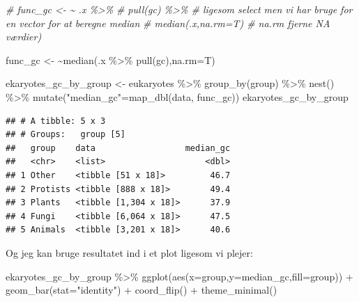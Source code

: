 \documentclass[
]{book}
\newenvironment{Shaded}{\begin{snugshade}}{\end{snugshade}}
\newcommand{\AttributeTok}[1]{\textcolor[rgb]{0.77,0.63,0.00}{#1}}
\newcommand{\CommentTok}[1]{\textcolor[rgb]{0.56,0.35,0.01}{\textit{#1}}}
\newcommand{\ErrorTok}[1]{\textcolor[rgb]{0.64,0.00,0.00}{\textbf{#1}}}
\newcommand{\FunctionTok}[1]{\textcolor[rgb]{0.00,0.00,0.00}{#1}}
\newcommand{\NormalTok}[1]{#1}
\newcommand{\OtherTok}[1]{\textcolor[rgb]{0.56,0.35,0.01}{#1}}
\newcommand{\SpecialCharTok}[1]{\textcolor[rgb]{0.00,0.00,0.00}{#1}}
\newcommand{\StringTok}[1]{\textcolor[rgb]{0.31,0.60,0.02}{#1}}
\begin{document}
\begin{Shaded}
\begin{Highlighting}[]
\CommentTok{\# func\_gc \textless{}{-} \textasciitilde{} .x \%\textgreater{}\% }
\CommentTok{\#   pull(gc) \%\textgreater{}\%       \# ligesom select men vi har bruge for en vector for at beregne median}
\CommentTok{\#   median(.x,na.rm=T) \# \textasciigrave{}na.rm\textasciigrave{} fjerne \textasciigrave{}NA\textasciigrave{} værdier)}

\NormalTok{func\_gc }\OtherTok{\textless{}{-}} \ErrorTok{\textasciitilde{}}\FunctionTok{median}\NormalTok{(.x }\SpecialCharTok{\%\textgreater{}\%} \FunctionTok{pull}\NormalTok{(gc),}\AttributeTok{na.rm=}\NormalTok{T) }

\NormalTok{ekaryotes\_gc\_by\_group }\OtherTok{\textless{}{-}}\NormalTok{ eukaryotes }\SpecialCharTok{\%\textgreater{}\%} 
  \FunctionTok{group\_by}\NormalTok{(group) }\SpecialCharTok{\%\textgreater{}\%} 
  \FunctionTok{nest}\NormalTok{() }\SpecialCharTok{\%\textgreater{}\%} 
  \FunctionTok{mutate}\NormalTok{(}\StringTok{"median\_gc"}\OtherTok{=}\FunctionTok{map\_dbl}\NormalTok{(data, func\_gc))}
\NormalTok{ekaryotes\_gc\_by\_group}
\end{Highlighting}
\end{Shaded}

\begin{verbatim}
## # A tibble: 5 x 3
## # Groups:   group [5]
##   group    data                  median_gc
##   <chr>    <list>                    <dbl>
## 1 Other    <tibble [51 x 18]>         46.7
## 2 Protists <tibble [888 x 18]>        49.4
## 3 Plants   <tibble [1,304 x 18]>      37.9
## 4 Fungi    <tibble [6,064 x 18]>      47.5
## 5 Animals  <tibble [3,201 x 18]>      40.6
\end{verbatim}

Og jeg kan bruge resultatet ind i et plot ligesom vi plejer:

\begin{Shaded}
\begin{Highlighting}[]
\NormalTok{ekaryotes\_gc\_by\_group }\SpecialCharTok{\%\textgreater{}\%} 
  \FunctionTok{ggplot}\NormalTok{(}\FunctionTok{aes}\NormalTok{(}\AttributeTok{x=}\NormalTok{group,}\AttributeTok{y=}\NormalTok{median\_gc,}\AttributeTok{fill=}\NormalTok{group)) }\SpecialCharTok{+} 
  \FunctionTok{geom\_bar}\NormalTok{(}\AttributeTok{stat=}\StringTok{"identity"}\NormalTok{) }\SpecialCharTok{+} 
  \FunctionTok{coord\_flip}\NormalTok{() }\SpecialCharTok{+}
  \FunctionTok{theme\_minimal}\NormalTok{() }
\end{Highlighting}
\end{Shaded}
\end{document}
